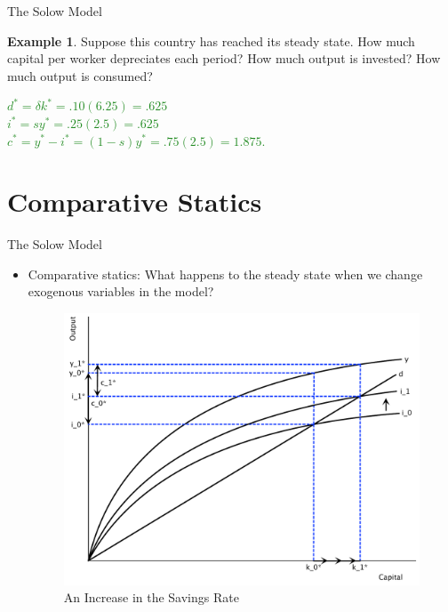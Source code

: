 \documentclass[xcolor={dvipsnames},pdf, hyperref={colorlinks=true, citecolor=ForestGreen, linkcolor=BlueViolet, urlcolor=Magenta}]{beamer}
\theoremstyle{definition}
\newtheorem{exmp}{Example}[section]
\newcommand{\ddp}[1]{{\textcolor{ForestGreen}{#1}}}
\begin{document}
\begin{frame}{The Solow Model}
\begin{exmp}
	Suppose this country has reached its steady state. How much capital per worker depreciates each period? How much output is invested? How much output is consumed? 
\end{exmp} 
\ddp{\pause $d^* = \delta k^* = .10(6.25) = .625$ \\
	\pause $i^* = sy^* = .25(2.5) = .625$ \\
	\pause $c^* = y^* - i^* = (1-s)y^* = .75(2.5) = 1.875$.}
\end{frame}

\section{Comparative Statics}

\begin{frame}{The Solow Model}
\begin{itemize}
	\item Comparative statics: What happens to the steady state when we change exogenous variables in the model?
	
	\begin{figure}[H]
		\centering
		\includegraphics[scale=.35]{plot86.pdf}
		\caption{An Increase in the Savings Rate}
	\end{figure}

\end{itemize}
\end{frame}
\end{document}
